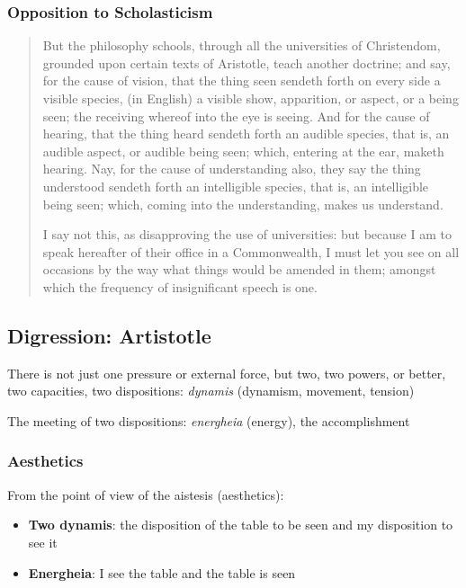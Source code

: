         \subsubsection{Opposition to Scholasticism}

            \begin{quote}
                But the philosophy schools, through all the universities of Christendom, grounded upon certain texts of Aristotle, teach another doctrine; and say, for the cause of vision, that the thing seen sendeth forth on every side a visible species, (in English) a visible show, apparition, or aspect, or a being seen; the receiving whereof into the eye is seeing. And for the cause of hearing, that the thing heard sendeth forth an audible species, that is, an audible aspect, or audible being seen; which, entering at the ear, maketh hearing. Nay, for the cause of understanding also, they say the thing understood sendeth forth an intelligible species, that is, an intelligible being seen; which, coming into the understanding, makes us understand.

                I say not this, as disapproving the use of universities: but because I am to speak hereafter of their office in a Commonwealth, I must let you see on all occasions by the way what things would be amended in them; amongst which the frequency of insignificant speech is one.
            \end{quote}

    \subsection*{Digression: Artistotle}

        \begin{remark}
            There is not just one pressure or external force, but two, two powers, or better, two capacities, two dispositions: \textit{dynamis} (dynamism, movement, tension)

            The meeting of two dispositions: \textit{energheia} (energy), the accomplishment
        \end{remark}

        \subsubsection{Aesthetics}

            From the point of view of the aistesis (aesthetics):
            
            \begin{itemize}
                \item \textbf{Two dynamis}: the disposition of the table to be seen and my disposition to see it
                \item \textbf{Energheia}: I see the table and the table is seen
            \end{itemize}


